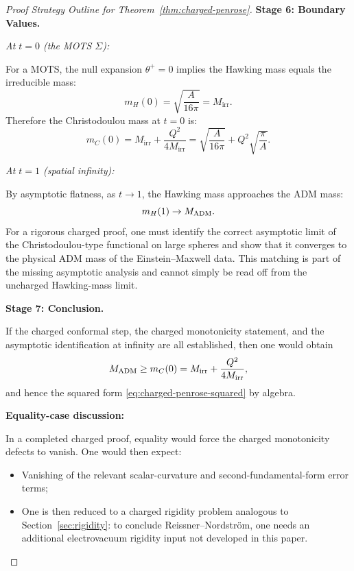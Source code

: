 \begin{proof}[Proof Strategy Outline for Theorem~\ref{thm:charged-penrose}]
\textbf{Stage 6: Boundary Values.}

\textit{At $t = 0$ (the MOTS $\Sigma$):}

For a MOTS, the null expansion $\theta^+ = 0$ implies the Hawking mass equals the irreducible mass:
\begin{equation}
    m_H(0) = \sqrt{\frac{A}{16\pi}} = M_{\mathrm{irr}}.
\end{equation}
Therefore the Christodoulou mass at $t = 0$ is:
\begin{equation}
    m_C(0) = M_{\mathrm{irr}} + \frac{Q^2}{4M_{\mathrm{irr}}} = \sqrt{\frac{A}{16\pi}} + Q^2\sqrt{\frac{\pi}{A}}.
\end{equation}

\textit{At $t = 1$ (spatial infinity):}

By asymptotic flatness, as $t \to 1$, the Hawking mass approaches the ADM mass:
\begin{equation}
    m_H(1) \to M_{\mathrm{ADM}}.
\end{equation}
For a rigorous charged proof, one must identify the correct asymptotic limit of the Christodoulou-type functional on large spheres and show that it converges to the physical ADM mass of the Einstein--Maxwell data. This matching is part of the missing asymptotic analysis and cannot simply be read off from the uncharged Hawking-mass limit.

\textbf{Stage 7: Conclusion.}

If the charged conformal step, the charged monotonicity statement, and the asymptotic identification at infinity are all established, then one would obtain
\[
M_{\mathrm{ADM}}\ge m_C(0)=M_{\mathrm{irr}}+\frac{Q^2}{4M_{\mathrm{irr}}},
\]
and hence the squared form \eqref{eq:charged-penrose-squared} by algebra.

\textbf{Equality-case discussion:}

In a completed charged proof, equality would force the charged monotonicity defects to vanish. One would then expect:
\begin{itemize}
    \item Vanishing of the relevant scalar-curvature and second-fundamental-form error terms;
    \item One is then reduced to a charged rigidity problem analogous to Section~\ref{sec:rigidity}: to conclude Reissner--Nordstr\"om, one needs an additional electrovacuum rigidity input not developed in this paper.
\end{itemize}
\end{proof}

